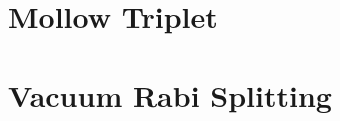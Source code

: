 \section{Mollow Triplet}



\section{Vacuum Rabi Splitting}


\printbibliography[segment=\therefsegment,heading=subbibliography]
